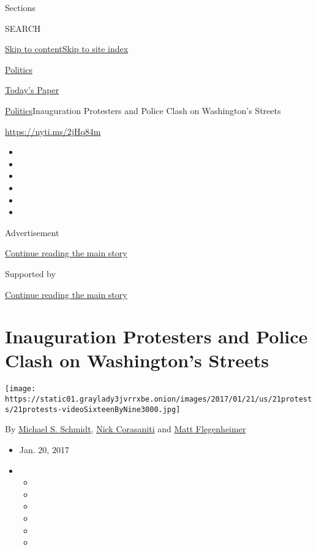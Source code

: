 Sections

SEARCH

\protect\hyperlink{site-content}{Skip to
content}\protect\hyperlink{site-index}{Skip to site index}

\href{https://www.nytimes3xbfgragh.onion/section/politics}{Politics}

\href{https://myaccount.nytimes3xbfgragh.onion/auth/login?response_type=cookie\&client_id=vi}{}

\href{https://www.nytimes3xbfgragh.onion/section/todayspaper}{Today's
Paper}

\href{/section/politics}{Politics}\textbar{}Inauguration Protesters and
Police Clash on Washington's Streets

\url{https://nyti.ms/2jHq84m}

\begin{itemize}
\item
\item
\item
\item
\item
\item
\end{itemize}

Advertisement

\protect\hyperlink{after-top}{Continue reading the main story}

Supported by

\protect\hyperlink{after-sponsor}{Continue reading the main story}

\hypertarget{inauguration-protesters-and-police-clash-on-washingtons-streets}{%
\section{Inauguration Protesters and Police Clash on Washington's
Streets}\label{inauguration-protesters-and-police-clash-on-washingtons-streets}}

\texttt{[image: https://static01.graylady3jvrrxbe.onion/images/2017/01/21/us/21protests/21protests-videoSixteenByNine3000.jpg]}

By \href{http://www.nytimes3xbfgragh.onion/by/michael-s-schmidt}{Michael
S. Schmidt},
\href{http://www.nytimes3xbfgragh.onion/by/nick-corasaniti}{Nick
Corasaniti} and
\href{http://www.nytimes3xbfgragh.onion/by/matt-flegenheimer}{Matt
Flegenheimer}

\begin{itemize}
\item
  Jan. 20, 2017
\item
  \begin{itemize}
  \item
  \item
  \item
  \item
  \item
  \item
  \end{itemize}
\end{itemize}

